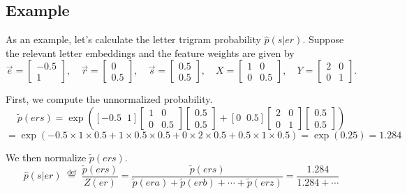 \documentclass[12pt]{article}
\theoremstyle{plain}
\theoremstyle{definition}
\theoremstyle{remark}
\begin{document}
\subsection*{Example}
As an example, let’s calculate the letter trigram probability $\hat{p}(s|er)$. Suppose the relevant letter embeddings and the feature weights are given by
\[
\vec{e} = \begin{bmatrix}-0.5 \\ 1 \end{bmatrix}, \quad 
\vec{r} = \begin{bmatrix} 0 \\ 0.5 \end{bmatrix}, \quad
\vec{s} = \begin{bmatrix} 0.5 \\ 0.5 \end{bmatrix}, \quad
X = \begin{bmatrix} 1 & 0 \\ 0 & 0.5 \end{bmatrix}, \quad
Y = \begin{bmatrix} 2 & 0 \\ 0 & 1 \end{bmatrix}.
\]

First, we compute the unnormalized probability.
\[
\tilde{p}(ers) = \exp \left( [-0.5 \;\; 1] 
\begin{bmatrix} 1 & 0 \\ 0 & 0.5 \end{bmatrix} 
\begin{bmatrix} 0.5 \\ 0.5 \end{bmatrix}
+ [0 \;\; 0.5] 
\begin{bmatrix} 2 & 0 \\ 0 & 1 \end{bmatrix} 
\begin{bmatrix} 0.5 \\ 0.5 \end{bmatrix} \right)
\]
\[
= \exp(-0.5 \times 1 \times 0.5 + 1 \times 0.5 \times 0.5 + 0 \times 2 \times 0.5 + 0.5 \times 1 \times 0.5) = \exp(0.25) = 1.284
\]

We then normalize $\tilde{p}(ers)$.
\[
\hat{p}(s|er) \;\stackrel{\text{def}}{=}\; \frac{\tilde{p}(ers)}{Z(er)} = \frac{\tilde{p}(ers)}{\tilde{p}(era) + \tilde{p}(erb) + \cdots + \tilde{p}(erz)} = \frac{1.284}{1.284 + \cdots}
\tag{12}
\]
\end{document}

